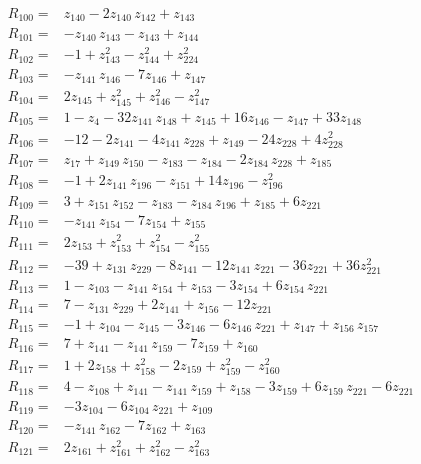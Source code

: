 \documentclass[11pt]{article}
\theoremstyle{remark}\newtheorem{remark}[theorem]{Remark}
\begin{document}
\begin{align*}
R_{100}={}& z_{140} - 2z_{140}\,z_{142} + z_{143} \\[2pt]
R_{101}={}& -z_{140}\,z_{143} - z_{143} + z_{144} \\[2pt]
R_{102}={}& -1 + z_{143}^{2} - z_{144}^{2} + z_{224}^{2} \\[2pt]
R_{103}={}& -z_{141}\,z_{146} - 7z_{146} + z_{147} \\[2pt]
R_{104}={}& 2z_{145} + z_{145}^{2} + z_{146}^{2} - z_{147}^{2} \\[2pt]
R_{105}={}& 1 - z_{4} - 32z_{141}\,z_{148} + z_{145} + 16z_{146} - z_{147} + 33z_{148} \\[2pt]
R_{106}={}& -12 - 2z_{141} - 4z_{141}\,z_{228} + z_{149} - 24z_{228} + 4z_{228}^{2} \\[2pt]
R_{107}={}& z_{17} + z_{149}\,z_{150} - z_{183} - z_{184} - 2z_{184}\,z_{228} + z_{185} \\[2pt]
R_{108}={}& -1 + 2z_{141}\,z_{196} - z_{151} + 14z_{196} - z_{196}^{2} \\[2pt]
R_{109}={}& 3 + z_{151}\,z_{152} - z_{183} - z_{184}\,z_{196} + z_{185} + 6z_{221} \\[2pt]
R_{110}={}& -z_{141}\,z_{154} - 7z_{154} + z_{155} \\[2pt]
R_{111}={}& 2z_{153} + z_{153}^{2} + z_{154}^{2} - z_{155}^{2} \\[2pt]
R_{112}={}& -39 + z_{131}\,z_{229} - 8z_{141} - 12z_{141}\,z_{221} - 36z_{221} + 36z_{221}^{2} \\[2pt]
R_{113}={}& 1 - z_{103} - z_{141}\,z_{154} + z_{153} - 3z_{154} + 6z_{154}\,z_{221} \\[2pt]
R_{114}={}& 7 - z_{131}\,z_{229} + 2z_{141} + z_{156} - 12z_{221} \\[2pt]
R_{115}={}& -1 + z_{104} - z_{145} - 3z_{146} - 6z_{146}\,z_{221} + z_{147} + z_{156}\,z_{157} \\[2pt]
R_{116}={}& 7 + z_{141} - z_{141}\,z_{159} - 7z_{159} + z_{160} \\[2pt]
R_{117}={}& 1 + 2z_{158} + z_{158}^{2} - 2z_{159} + z_{159}^{2} - z_{160}^{2} \\[2pt]
R_{118}={}& 4 - z_{108} + z_{141} - z_{141}\,z_{159} + z_{158} - 3z_{159} + 6z_{159}\,z_{221} - 6z_{221} \\[2pt]
R_{119}={}& -3z_{104} - 6z_{104}\,z_{221} + z_{109} \\[2pt]
R_{120}={}& -z_{141}\,z_{162} - 7z_{162} + z_{163} \\[2pt]
R_{121}={}& 2z_{161} + z_{161}^{2} + z_{162}^{2} - z_{163}^{2} \\[2pt]

\end{align*}
\end{document}
